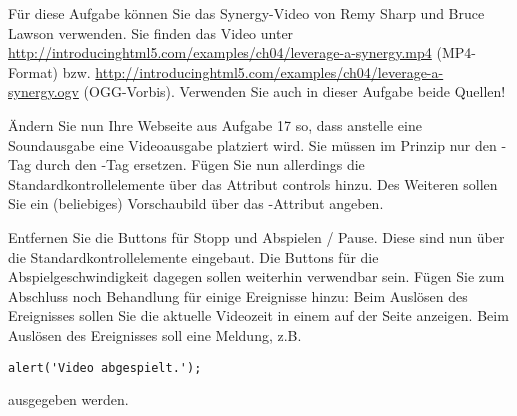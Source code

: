 %
\par Für diese Aufgabe können Sie das Synergy-Video von Remy Sharp und Bruce Lawson verwenden. Sie finden das Video unter \url{http://introducinghtml5.com/examples/ch04/leverage-a-synergy.mp4} (MP4-Format) bzw. \url{http://introducinghtml5.com/examples/ch04/leverage-a-synergy.ogv} (OGG-Vorbis). Verwenden Sie auch in dieser Aufgabe beide Quellen!
%
\par Ändern Sie nun Ihre Webseite aus Aufgabe 17 so, dass anstelle eine Soundausgabe eine Videoausgabe platziert wird. Sie müssen im Prinzip nur den -Tag durch den -Tag ersetzen. Fügen Sie nun allerdings die Standardkontrollelemente über das Attribut controls hinzu. Des Weiteren sollen Sie ein (beliebiges) Vorschaubild über das -Attribut angeben.
%
\par Entfernen Sie die Buttons für Stopp und Abspielen / Pause. Diese sind nun über die Standardkontrollelemente eingebaut. Die Buttons für die Abspielgeschwindigkeit dagegen sollen weiterhin verwendbar sein. Fügen Sie zum Abschluss noch Behandlung für einige Ereignisse hinzu: Beim Auslösen des  Ereignisses sollen Sie die aktuelle Videozeit in einem  auf der Seite anzeigen. Beim Auslösen des  Ereignisses soll eine Meldung, z.B.
%
\begin{lstlisting}
alert('Video abgespielt.');
\end{lstlisting}
%
ausgegeben werden.